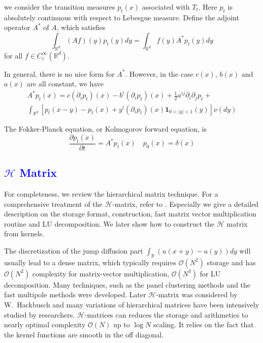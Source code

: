 \documentclass[3p,,preprint,12pt]{elsarticle}
\newcommand{\RR}[0]{\mathbb{R}}
\newcommand{\lib}[1]{\textcolor{blue}{\section{#1}}}
\theoremstyle{definition}
\begin{document}
 we consider the transition measures $p_t(x)$ associated with $T_t$. Here $p_t$ is absolutely continuous with respect to Lebesgue measure. Define the adjoint operator $A^*$ of $A$, which satisfies
 \begin{equation}
 	\int_{\RR^d} (Af)(y) p_t(y)dy=\int_{\RR^d} f(y)A^*p_t(y)dy
 \end{equation}
 for all $f\in C_c^\infty(\RR^d)$.
 

 In general, there is no nice form for $A^*$. However, in the case $c(x)$, $b(x)$ and $a(x)$ are all constant, we have
 \begin{multline}
 	A^*p_t(x) = c (\partial_i p_t)(x) - b^i (\partial_i p_t)(x) + \frac{1}{2}a^{ij}\partial_i\partial_j p_t +\\
 	\int_{\RR^d}\left[ p_t( x-y) -p_t(x)+y^i(\partial_i p_t)(x) \mathbf{1}_{0<|y|<1}(y) \right]\nu(dy)
 \end{multline}
 
 The Fokker-Planck equation, or Kolmogorov forward equation, is~\cite{sun2012fokker}
 \begin{equation}
 	\frac{\partial p_t(x)}{\partial t} = A^*p_t(x)\quad p_0(x) = \delta(x)
 \end{equation}
 
 
 
\lib{$\mathcal{H}$ Matrix}

For completeness, we review the hierarchical matrix technique. For a comprehensive treatment of the $\mathcal{H}$-matrix, refer to \cite{borm2003introduction,bebendorf2008hierarchical,yang2008construction}. Especially we give a detailed description on the storage format, construction, fast matrix vector multiplication routine and LU decomposition. We later show how to construct the $\mathcal{H}$ matrix from kernels. 

The discretization of the jump diffusion part $\int_\RR (u(x+y)-u(y))dy$ will usually lead to a dense matrix, which typically requires $\mathcal{O}(N^2)$ storage and has $\mathcal{O}(N^2)$ complexity for matrix-vector multiplication, $\mathcal{O}(N^3)$ for LU decomposition. Many techniques, such as the panel clustering methods and the fast multipole methods were developed. Later $\mathcal{H}$-matrix was considered by W.~Hackbusch and many variations of hierarchical matrices have been intensively studied by researchers. $\mathcal{H}$-matrices can reduces the storage and arithmetics to nearly optimal complexity $\mathcal{O}(N)$ up to $\log N$ scaling. It relies on the fact that the kernel functions are smooth in the off diagonal. 
\end{document}
